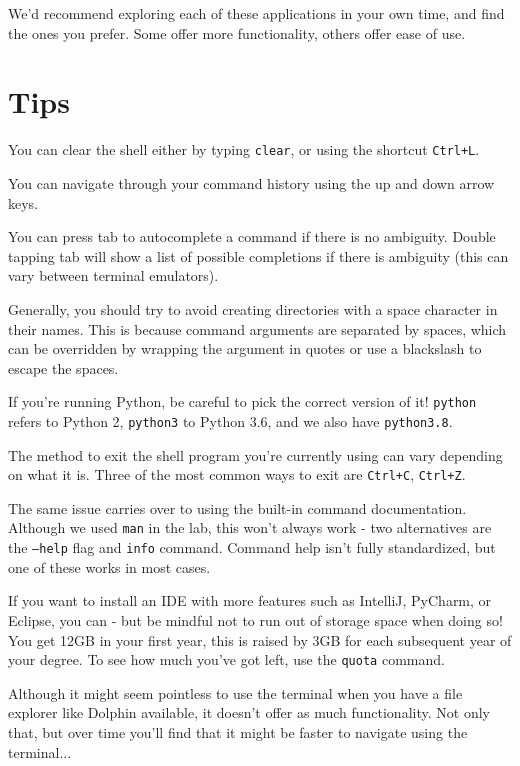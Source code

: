 \documentclass[a4paper,11pt,parskip=half-]{scrartcl}
\begin{document}
\raggedright

We'd recommend exploring each of these applications in your own time, and find the ones you prefer. Some offer more functionality, others offer ease of use.

\section*{Tips}

You can clear the shell either by typing \texttt{clear}, or using the shortcut \texttt{Ctrl+L}.

You can navigate through your command history using the up and down arrow keys.

You can press tab to autocomplete a command if there is no ambiguity. 
Double tapping tab will show a list of possible completions if there is ambiguity (this can vary between terminal emulators).

Generally, you should try to avoid creating directories with a space character in their names. 
This is because command arguments are separated by spaces, which can be overridden by wrapping the argument in quotes or use a blackslash to escape the spaces.

If you're running Python, be careful to pick the correct version of it! 
\texttt{python} refers to Python 2, \texttt{python3} to Python 3.6, and we also have \texttt{python3.8}.

The method to exit the shell program you're currently using can vary depending on what it is.
Three of the most common ways to exit are \texttt{Ctrl+C}, \texttt{Ctrl+Z}.

The same issue carries over to using the built-in command documentation. 
Although we used \texttt{man} in the lab, this won't always work - two alternatives are the \texttt{--help} flag and \texttt{info} command. Command help isn't fully standardized, but one of these works in most cases.

If you want to install an IDE with more features such as IntelliJ, PyCharm, or Eclipse, you can 
- but be mindful not to run out of storage space when doing so! 
You get 12GB in your first year, this is raised by 3GB for each subsequent year of your degree. 
To see how much you've got left, use the \texttt{quota} command.

Although it might seem pointless to use the terminal when you have a file explorer like Dolphin available, it doesn't offer as much functionality. 
Not only that, but over time you'll find that it might be faster to navigate using the terminal...
\end{document}
